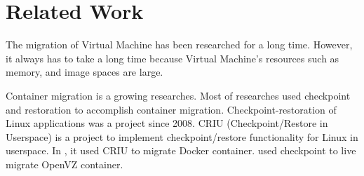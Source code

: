 \chapter{Related Work}
\label{chap:related}

The migration of Virtual Machine \cite{clark2005live, liu2013performance} has been researched for a long time.
However, it always has to take a long time because Virtual Machine's resources such as memory, and image spaces are large.

Container migration is a growing researches. Most of researches used checkpoint and restoration to accomplish container migration.
Checkpoint-restoration of Linux applications \cite{laadan2010linux} was a project since 2008. CRIU (Checkpoint/Restore in Userspace) is a project to implement checkpoint/restore functionality for Linux in userspace.
In \cite{yang2015checkpoint}, it used CRIU to migrate Docker container.
\cite{mirkin2008containers} used checkpoint to live migrate OpenVZ container.